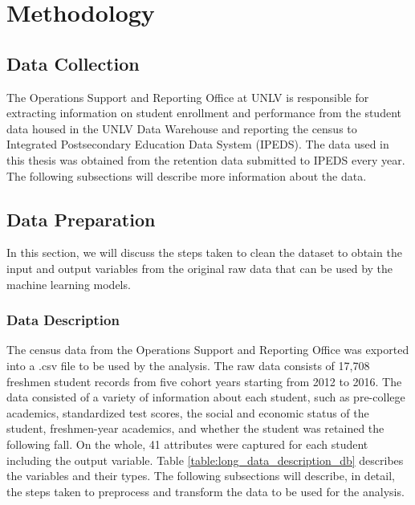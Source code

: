 \documentclass[11pt,openright]{report}
\begin{document}
\chapter{Methodology} \label{chapter:methodology}
\section{Data Collection}

The Operations Support and Reporting Office at UNLV is responsible for extracting information on student enrollment and performance from the student data housed in the UNLV Data Warehouse and reporting the census to Integrated Postsecondary Education Data System (IPEDS). The data used in this thesis was obtained from the retention data submitted to IPEDS every year. The following subsections will describe more information about the data.

\section {Data Preparation}
In this section, we will discuss the steps taken to clean the dataset to obtain the input and output variables from the original raw data that can be used by the machine learning models. 
\subsection{Data Description}
The census data from the Operations Support and Reporting Office was exported into a .csv file to be used by the analysis. The raw data consists of 17,708 freshmen student records from five cohort years starting from 2012 to 2016. The data consisted of a variety of information about each student, such as pre-college academics, standardized test scores, the social and economic status of the student, freshmen-year academics, and whether the student was retained the following fall. On the whole, 41 attributes were captured for each student including the output variable. Table \ref{table:long_data_description_db} describes the variables and their types. The following subsections will describe, in detail, the steps taken to preprocess and transform the data to be used for the analysis.
\end{document}
